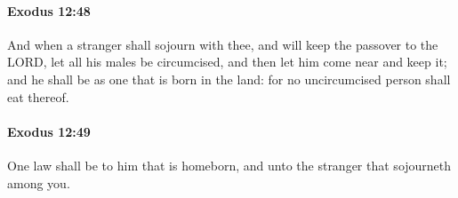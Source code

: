 		\paragraph{Exodus 12:48} %
			\label{EXODUS-12-48}

			And when a stranger shall sojourn with thee, and will keep the passover to the LORD, let all his males be circumcised, and then let him come near and keep it; and he shall be as one that is born in the land: for no uncircumcised person shall eat thereof.


		\paragraph{Exodus 12:49} %
			\label{EXODUS-12-49}

			One law shall be to him that is homeborn, and unto the stranger that sojourneth among you.



